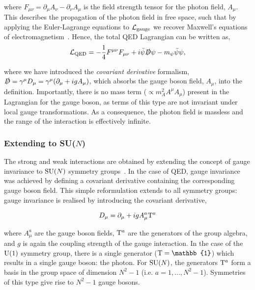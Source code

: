 \noindent
where $F_{\mu\nu}=\partial_{\mu}A_\nu-\partial_{\nu}A_\mu$ is the field strength tensor for the photon field, $A_\mu$. This describes the propagation of the photon field in free space, such that by applying the Euler-Lagrange equations to $\mathcal{L}_{\rm{gauge}}$ we recover Maxwell's equations of electromagnetism~\cite{Aitchison:2003tq}. Hence, the total QED Lagrangian can be written as, 
\begin{equation}
    \mathcal{L}_{\rm{QED}} = -\frac{1}{4}F^{\mu\nu}F_{\mu\nu} + i\bar{\psi}\slashed{D}\psi - m_{\psi}\bar{\psi}\psi,
\end{equation}

\noindent
where we have introduced the \textit{covariant derivative} formalism, $\slashed{D} = \gamma^{\mu}D_\mu = \gamma^{\mu}(\partial_{\mu}+igA_\mu)$, which absorbs the gauge boson field, $A_\mu$, into the definition. Importantly, there is no mass term ($\propto m_A^2 A^{\mu}A_\mu$) present in the Lagrangian for the gauge boson, as terms of this type are not invariant under local gauge transformations. As a consequence, the photon field is massless and the range of the interaction is effectively infinite.

\subsubsection{Extending to SU($N$)}
The strong and weak interactions are obtained by extending the concept of gauge invariance to ${\rm{SU}}(N)$ symmetry groups~\cite{Aitchison:2004cs}. In the case of QED, gauge invariance was achieved by defining a covariant derivative containing the corresponding gauge boson field. This simple reformulation extends to all symmetry groups: gauge invariance is realised by introducing the covariant derivative, 

\begin{equation}
    D_\mu = \partial_\mu + i g A^a_\mu {\rm{T}}^a
\end{equation}

\noindent
where $A^a_\mu$ are the gauge boson fields, ${\rm{T}}^a$ are the generators of the group algebra, and $g$ is again the coupling strength of the gauge interaction. In the case of the ${\rm{U}}(1)$ symmetry group, there is a single generator (${\rm{T}}=\mathbb{1}$) which results in a single gauge boson: the photon. For ${\rm{SU}}(N)$, the generators ${\rm{T}}^a$ form a basis in the group space of dimension $N^2-1$ (i.e. $a=1,...,N^2-1$). Symmetries of this type give rise to $N^2-1$ gauge bosons.

